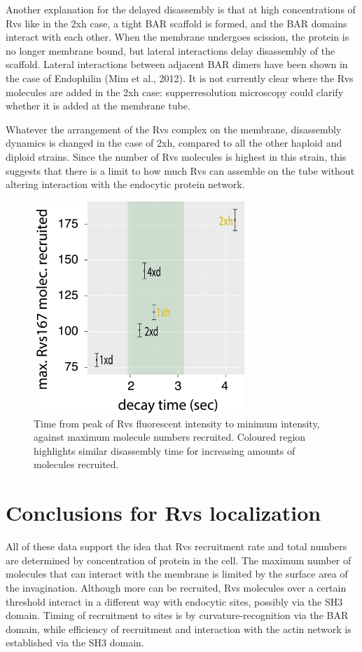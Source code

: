 	\vspace{5mm}
Another explanation for the delayed disassembly is that at high concentrations of Rvs like in the 2xh case, a tight BAR scaffold is formed, and the BAR domains interact with each other. When the membrane undergoes scission, the protein is no longer membrane bound, but lateral interactions delay disassembly of the scaffold. Lateral interactions between adjacent BAR dimers have been shown in the case of Endophilin  (Mim et al., 2012). It is not currently clear where the Rvs molecules are added in the 2xh case: supperresolution microscopy could clarify whether it is added at the membrane tube.

\vspace{5mm}
Whatever the arrangement of the Rvs complex on the membrane, disassembly dynamics is changed in the case of 2xh, compared to all the other haploid and diploid strains. Since the number of Rvs molecules is highest in this strain, this suggests that there is a limit to how much Rvs can assemble on the tube without altering interaction with the endocytic protein network. 

\begin{figure}[H]
	\centering
	\includegraphics[width=8cm,height=8cm,keepaspectratio]{figures/discussion/decay_final}
	\caption[Rvs decay time]
	{Time from peak of Rvs fluorescent intensity to minimum intensity, against maximum molecule numbers recruited. Coloured region highlights similar disassembly time for increasing amounts of molecules recruited.    
		\label{decay_final}}
\end{figure}

\section{Conclusions for Rvs localization }
All of these data support the idea that Rvs recruitment rate and total numbers are determined by concentration of protein in the cell. The maximum number of molecules that can interact with the membrane is limited by the surface area of the invagination. Although more can be recruited, Rvs molecules over a certain threshold interact in a different way with endocytic sites, possibly via the SH3 domain. Timing of recruitment to sites is by curvature-recognition via the BAR domain, while efficiency of recruitment and interaction with the actin network is established via the SH3 domain. 



